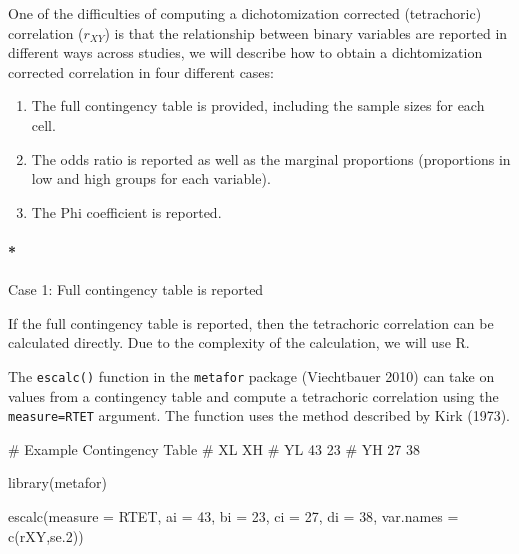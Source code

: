 \documentclass[
  letterpaper,
  DIV=11,
  numbers=noendperiod]{scrreprt}
\let\oldparagraph\paragraph
\renewcommand{\paragraph}[1]{\oldparagraph{#1}\mbox{}}
\newenvironment{Shaded}{}{}
\newcommand{\AttributeTok}[1]{\textcolor[rgb]{0.00,0.34,0.68}{#1}}
\newcommand{\CommentTok}[1]{\textcolor[rgb]{0.54,0.53,0.53}{#1}}
\newcommand{\DecValTok}[1]{\textcolor[rgb]{0.69,0.50,0.00}{#1}}
\newcommand{\FunctionTok}[1]{\textcolor[rgb]{0.39,0.29,0.61}{#1}}
\newcommand{\NormalTok}[1]{\textcolor[rgb]{0.12,0.11,0.11}{#1}}
\newcommand{\StringTok}[1]{\textcolor[rgb]{0.75,0.01,0.01}{#1}}
\providecommand{\tightlist}{%
  \setlength{\itemsep}{0pt}\setlength{\parskip}{0pt}}\usepackage{longtable,booktabs,array}
\begin{document}
One of the difficulties of computing a dichotomization corrected
(tetrachoric) correlation (\(r_{XY}\)) is that the relationship between
binary variables are reported in different ways across studies, we will
describe how to obtain a dichtomization corrected correlation in four
different cases:

\begin{enumerate}
\def\labelenumi{\arabic{enumi}.}
\tightlist
\item
  The full contingency table is provided, including the sample sizes for
  each cell.
\item
  The odds ratio is reported as well as the marginal proportions
  (proportions in low and high groups for each variable).
\item
  The Phi coefficient is reported.
\end{enumerate}

\paragraph*{Case 1: Full contingency table is
reported}\label{case-1-full-contingency-table-is-reported}

If the full contingency table is reported, then the tetrachoric
correlation can be calculated directly. Due to the complexity of the
calculation, we will use R.

The \texttt{escalc()} function in the \texttt{metafor} package
(Viechtbauer 2010) can take on values from a contingency table and
compute a tetrachoric correlation using the
\texttt{measure=\textquotesingle{}RTET\textquotesingle{}} argument. The
function uses the method described by Kirk (1973).

\begin{Shaded}
\begin{Highlighting}[]
\CommentTok{\# Example Contingency Table}
\CommentTok{\#    XL   XH}
\CommentTok{\# YL 43   23}
\CommentTok{\# YH 27   38  }

\FunctionTok{library}\NormalTok{(metafor)}

\FunctionTok{escalc}\NormalTok{(}\AttributeTok{measure =} \StringTok{\textquotesingle{}RTET\textquotesingle{}}\NormalTok{,}
       \AttributeTok{ai =} \DecValTok{43}\NormalTok{,}
       \AttributeTok{bi =} \DecValTok{23}\NormalTok{,}
       \AttributeTok{ci =} \DecValTok{27}\NormalTok{,}
       \AttributeTok{di =} \DecValTok{38}\NormalTok{,}
       \AttributeTok{var.names =} \FunctionTok{c}\NormalTok{(}\StringTok{\textquotesingle{}rXY\textquotesingle{}}\NormalTok{,}\StringTok{\textquotesingle{}se.2\textquotesingle{}}\NormalTok{))}
\end{Highlighting}
\end{Shaded}
\end{document}

